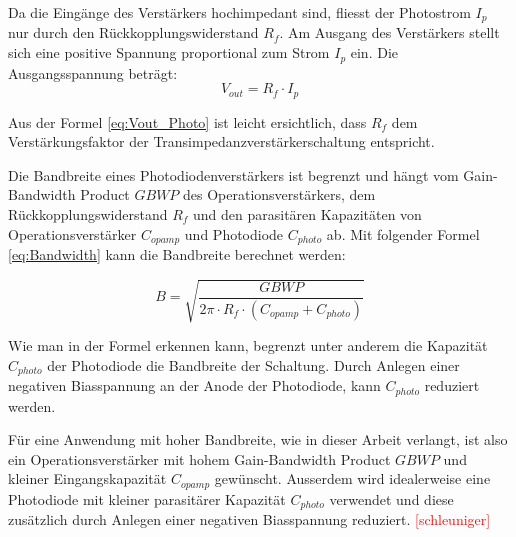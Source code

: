 Da die Eingänge des Verstärkers hochimpedant sind, fliesst der Photostrom $ I_{p} $ nur durch den Rückkopplungswiderstand $ R_{f} $. Am Ausgang des Verstärkers stellt sich eine positive Spannung proportional zum Strom $ I_{p} $ ein. Die Ausgangsspannung beträgt:
\begin{equation}\label{eq:Vout_Photo}
V_{out}=R_{f} \cdot I_{p}
\end{equation}

Aus der Formel \ref{eq:Vout_Photo} ist leicht ersichtlich, dass $ R_{f} $ dem Verstärkungsfaktor der Transimpedanzverstärkerschaltung entspricht.

Die Bandbreite eines Photodiodenverstärkers ist begrenzt und hängt vom Gain-Bandwidth Product $GBWP$ des Operationsverstärkers, dem Rückkopplungswiderstand $ R_{f} $ und den parasitären Kapazitäten von Operationsverstärker $ C_{opamp} $ und Photodiode $ C_{photo} $ ab. Mit folgender Formel \ref{eq:Bandwidth} kann die Bandbreite berechnet werden:

\begin{equation}\label{eq:Bandwidth}
B=\sqrt{\frac{GBWP}{2\pi\cdot R_{f}\cdot (C_{opamp}+C_{photo})}}
\end{equation}

Wie man in der Formel erkennen kann, begrenzt unter anderem die Kapazität $ C_{photo} $ der Photodiode die Bandbreite der Schaltung. Durch Anlegen einer negativen Biasspannung an der Anode der Photodiode, kann $ C_{photo} $ reduziert werden.

Für eine Anwendung mit hoher Bandbreite, wie in dieser Arbeit verlangt, ist also ein Operationsverstärker mit hohem Gain-Bandwidth Product $GBWP$ und kleiner Eingangskapazität $ C_{opamp} $ gewünscht. Ausserdem wird idealerweise eine Photodiode mit kleiner parasitärer Kapazität $ C_{photo} $ verwendet und diese zusätzlich durch Anlegen einer negativen Biasspannung reduziert. \textcolor{red}{[schleuniger]}
